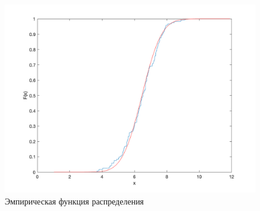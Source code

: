 \documentclass[12pt, a4paper]{report}
\begin{document}
	\newpage
	
	\begin{figure}[H]
		\centering
		\includegraphics[scale=0.52]{img/EmpericalFunc.png}
		\caption{Эмпирическая функция распределения}
	\end{figure}
	
	
		
	
\end{document}
